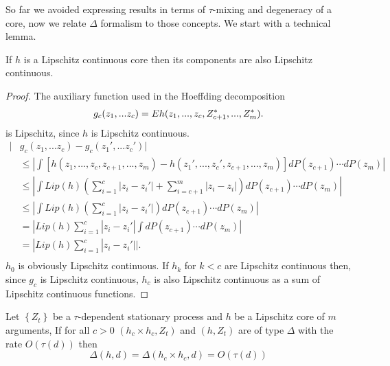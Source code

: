 So far we  avoided expressing results in terms of $\tau$-mixing and degeneracy of a core, now we relate $\varDelta$ formalism to those concepts. We start with a technical lemma. 
\begin{lemma}
\label{stm:LipAndBound}
 If $h$ is a  Lipschitz continuous core then its components are also Lipschitz continuous.
\end{lemma}
\begin{proof}
The auxiliary function  used in the Hoeffding decomposition
\begin{align*}
g_c(z_1,...z_c) = E h(z_1,...,z_c,Z_{c+1}^*,...,Z_{m}^*).  
\end{align*}
is Lipschitz, since $h$ is Lipschitz continuous.
\begin{align*}
|&g_c(z_1,...z_c) - g_c(z_1',...z_c')| \\
 &\leq \left| \int    [h(z_1,...,z_c,z_{c+1},...,z_{m}) - h(z_1',...,z_c',z_{c+1},...,z_{m}) ] dP(z_{c+1}) \cdots dP(z_m)\right| \\
 &\leq \left| \int    Lip(h) \left(  \sum_{i=1}^c | z_i - z_i'| + \sum_{i=c+1}^m | z_i - z_i|  \right)  dP(z_{c+1})  \cdots dP(z_m) \right| \\
  &\leq \left| \int    Lip(h) \left(  \sum_{i=1}^c | z_i - z_i'|   \right)   dP(z_{c+1})  \cdots dP(z_m) \right| \\
& = | Lip(h)   \sum_{i=1}^c | z_i - z_i'| \int  dP(z_{c+1})   \cdots dP(z_m)  |  \\
& = | Lip(h)   \sum_{i=1}^c | z_i - z_i'|  |.  \\
\end{align*}
$h_0$ is obviously Lipschitz continuous. If $h_{k}$ for $k<c$ are Lipschitz continuous then, since $g_c$ is Lipschitz continuous, $h_c$ is also Lipschitz continuous as a sum of Lipschitz continuous functions.
\end{proof}
\begin{lemma}
\label{lem:disentangle}
Let $\left\{ Z_{t}\right\} $ be a $\tau$-dependent stationary process and $h$ be a Lipschitz  core of $m$ arguments, If   for all $c>0$
$(h_c \times h_c,Z_t)$ and $(h,Z_t)$  are of type $\varDelta$ with the rate  $O(\tau(d))$ then 
\[
 \varDelta(h,d) =\varDelta(h_c \times h_c,d)  = O(\tau(d))
\]
\end{lemma}

